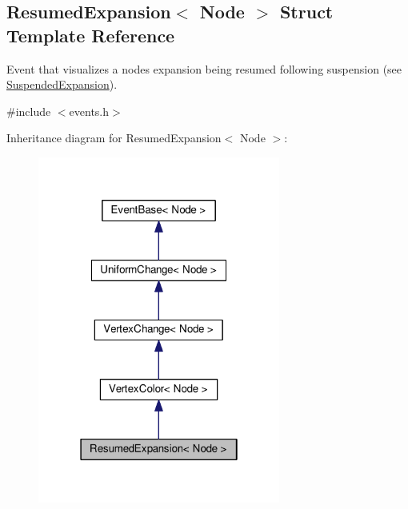 \hypertarget{structResumedExpansion}{}\subsection{Resumed\+Expansion$<$ Node $>$ Struct Template Reference}
\label{structResumedExpansion}


Event that visualizes a node\textquotesingle{}s expansion being resumed following suspension (see \hyperlink{structSuspendedExpansion}{Suspended\+Expansion}).  




{\ttfamily \#include $<$events.\+h$>$}



Inheritance diagram for Resumed\+Expansion$<$ Node $>$\+:\nopagebreak
\begin{figure}[H]
\begin{center}
\leavevmode
\includegraphics[width=226pt]{structResumedExpansion__inherit__graph}
\end{center}
\end{figure}


